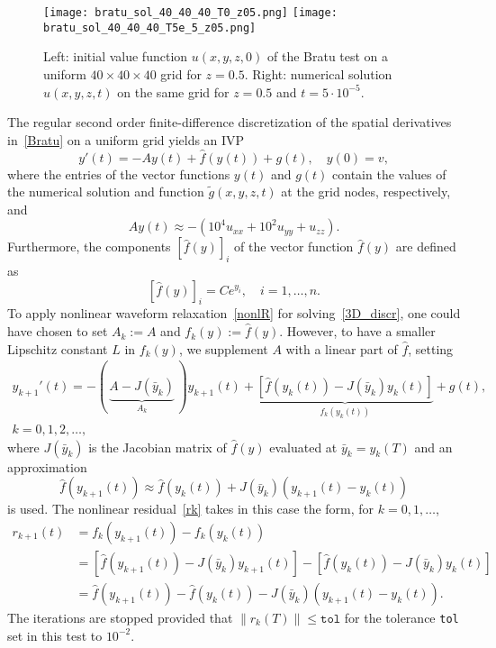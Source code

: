 \documentclass[sn-aps]{sn-jnl}
\theoremstyle{thmstyleone}%
\theoremstyle{thmstyletwo}%
\theoremstyle{thmstylethree}%
\newcommand{\leqs}{\leqslant}
\begin{document}
\begin{figure}
\centerline{%
\texttt{[image: bratu\_sol\_40\_40\_40\_T0\_z05.png]}\hfill
\texttt{[image: bratu\_sol\_40\_40\_40\_T5e\_5\_z05.png]}}  
\caption{Left: initial value function $u(x,y,z,0)$ of the Bratu test 
on a uniform $40\times 40\times 40$ grid for $z=0.5$.  
Right: numerical solution $u(x,y,z,t)$ on the same grid for 
$z=0.5$ and $t=5\cdot 10^{-5}$.}
\label{f:3D_Bratu}  
\end{figure}

The regular second order finite-difference discretization of the spatial derivatives
in~\eqref{Bratu} on a uniform grid yields an IVP
\begin{equation}
\label{3D_discr}
y'(t) = -Ay(t) + \hat{f}(y(t)) + g(t), \quad y(0)=v,  
\end{equation}
where the entries of the vector functions $y(t)$ and $g(t)$ contain the values
of the numerical solution and function $\tilde{g}(x,y,z,t)$ at the grid nodes,
respectively, and
$$
A y(t)\approx -(10^4u_{xx} + 10^2u_{yy} + u_{zz}).
$$
Furthermore, the components $[\hat{f}(y)]_i$ of the vector function $\hat{f}(y)$ are
defined as 
$$
\left[\hat{f}(y)\right]_i = C e^{y_i},\quad i=1,\dots,n.
$$
To apply nonlinear waveform relaxation~\eqref{nonlR} for solving~\eqref{3D_discr},
one could have chosen to set $A_k:=A$ and $f_k(y):=\hat{f}(y)$. 
However, to have a smaller Lipschitz constant $L$ in $f_k(y)$, we supplement
$A$ with a linear part of $\hat{f}$, setting
\begin{equation}
\label{nonlR_3D}
\begin{aligned}
y_{k+1}'(t) =
- (\,\underbrace{A - J(\bar{y}_k)}_{\displaystyle A_k}\,)y_{k+1}(t)
+ \underbrace{\left[\hat{f}(y_k(t)) - J(\bar{y}_k)y_k(t)\right]}_{\displaystyle f_k(y_k(t))} + g(t),
\\
k=0,1,2,\dots,
\end{aligned}
\end{equation}
where $J(\bar{y}_k)$ is the Jacobian matrix of $\hat{f}(y)$ evaluated at 
$\bar{y}_k=y_k(T)$ and an approximation
$$
\hat{f}(y_{k+1}(t)) \approx \hat{f}(y_k(t)) + J(\bar{y}_k) (y_{k+1}(t)-y_k(t))
$$
is used.  The nonlinear residual~\eqref{rk} takes in this case the form, 
for $k=0,1,\dots$,
\begin{align*}
r_{k+1}(t) &= f_k(y_{k+1}(t)) - f_k(y_{k}(t))\\
          &= 
\left[\hat{f}(y_{k+1}(t)) - J(\bar{y}_k)y_{k+1}(t)\right] -
\left[\hat{f}(y_k(t)) - J(\bar{y}_k)y_k(t)\right]
\\
&= \hat{f}(y_{k+1}(t)) - \hat{f}(y_k(t)) - J(\bar{y}_k)(y_{k+1}(t) - y_k(t)).
\end{align*}
The iterations are stopped provided that
$\|r_k(T)\|\leqs\texttt{tol}$ for the tolerance \texttt{tol} set in this test to
$10^{-2}$.
\end{document}

